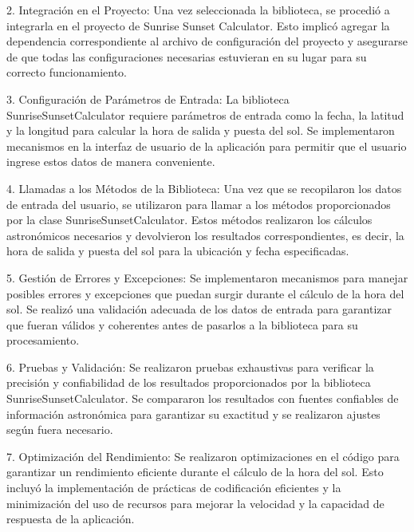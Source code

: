 \documentclass[conference]{IEEEtran}
\begin{document}
2. Integración en el Proyecto: Una vez seleccionada la biblioteca, se procedió a integrarla en el proyecto de Sunrise Sunset Calculator. Esto implicó agregar la dependencia correspondiente al archivo de configuración del proyecto y asegurarse de que todas las configuraciones necesarias estuvieran en su lugar para su correcto funcionamiento.

3. Configuración de Parámetros de Entrada: La biblioteca SunriseSunsetCalculator requiere parámetros de entrada como la fecha, la latitud y la longitud para calcular la hora de salida y puesta del sol. Se implementaron mecanismos en la interfaz de usuario de la aplicación para permitir que el usuario ingrese estos datos de manera conveniente.

4. Llamadas a los Métodos de la Biblioteca: Una vez que se recopilaron los datos de entrada del usuario, se utilizaron para llamar a los métodos proporcionados por la clase SunriseSunsetCalculator. Estos métodos realizaron los cálculos astronómicos necesarios y devolvieron los resultados correspondientes, es decir, la hora de salida y puesta del sol para la ubicación y fecha especificadas.

5. Gestión de Errores y Excepciones: Se implementaron mecanismos para manejar posibles errores y excepciones que puedan surgir durante el cálculo de la hora del sol. Se realizó una validación adecuada de los datos de entrada para garantizar que fueran válidos y coherentes antes de pasarlos a la biblioteca para su procesamiento.

6. Pruebas y Validación: Se realizaron pruebas exhaustivas para verificar la precisión y confiabilidad de los resultados proporcionados por la biblioteca SunriseSunsetCalculator. Se compararon los resultados con fuentes confiables de información astronómica para garantizar su exactitud y se realizaron ajustes según fuera necesario.

7. Optimización del Rendimiento: Se realizaron optimizaciones en el código para garantizar un rendimiento eficiente durante el cálculo de la hora del sol. Esto incluyó la implementación de prácticas de codificación eficientes y la minimización del uso de recursos para mejorar la velocidad y la capacidad de respuesta de la aplicación.
\end{document}
